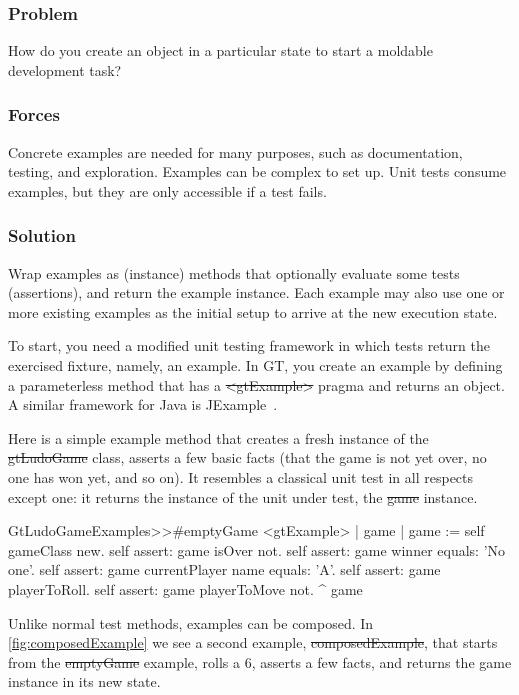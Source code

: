 \documentclass[sigconf]{acmart}
\begin{document}
\subsubsection*{Problem}
How do you create an object in a particular state to start a moldable development task?

\subsubsection*{Forces}
Concrete examples are needed for many purposes, such as documentation, testing, and exploration.
Examples can be complex to set up.
Unit tests consume examples, but they are only accessible if a test fails.

\subsubsection*{Solution}
Wrap examples as (instance) methods that optionally evaluate some tests (assertions), and return the example instance.
Each example may also use one or more existing examples as the initial setup to arrive at the new execution state.

To start, you need a modified unit testing framework in which tests return the exercised fixture, namely, an example.
In GT, you create an example by defining a parameterless method that has a \st{<gtExample>} pragma and returns an object.
A similar framework for Java is JExample~\cite{Kuhn08a}.

Here is a simple example method that creates a fresh instance of the \st{gtLudoGame} class, asserts a few basic facts (\ie that the game is not yet over, no one has won yet, and so on).
It resembles a classical unit test in all respects except one: it returns the instance of the unit under test, \ie the \st{game} instance.

\begin{code}
GtLudoGameExamples>>#emptyGame
	<gtExample>
	| game |
	game := self gameClass new.
	self assert: game isOver not.
	self assert: game winner equals: 'No one'.
	self assert: game currentPlayer name equals: 'A'.
	self assert: game playerToRoll.
	self assert: game playerToMove not.
	^ game
\end{code}
    
Unlike normal test methods, examples can be composed.
In \autoref{fig:composedExample} we see a second example, \st{composedExample}, that starts from the \st{emptyGame} example, rolls a $6$, asserts a few facts, and returns the game instance in its new state.
\end{document}
